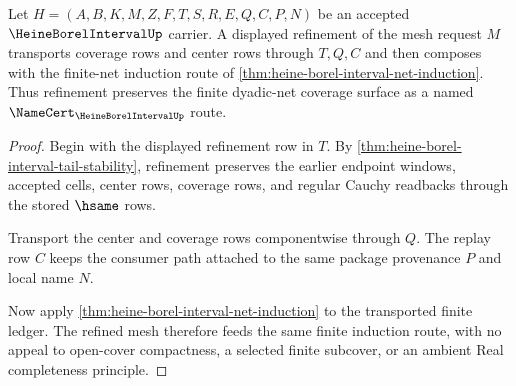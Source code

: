 \begin{theorem}
\label{thm:heine-borel-interval-mesh-refinement-functoriality}
Let $H=(A,B,K,M,Z,F,T,S,R,E,Q,C,P,N)$ be an accepted $\HeineBorelIntervalUp$ carrier. A displayed refinement of the mesh request $M$ transports coverage rows and center rows through $T,Q,C$ and then composes with the finite-net induction route of \autoref{thm:heine-borel-interval-net-induction}. Thus refinement preserves the finite dyadic-net coverage surface as a named $\NameCert_{\HeineBorelIntervalUp}$ route.
\end{theorem}
\begin{proof}
Begin with the displayed refinement row in $T$. By \autoref{thm:heine-borel-interval-tail-stability}, refinement preserves the earlier endpoint windows, accepted cells, center rows, coverage rows, and regular Cauchy readbacks through the stored $\hsame$ rows.

Transport the center and coverage rows componentwise through $Q$. The replay row $C$ keeps the consumer path attached to the same package provenance $P$ and local name $N$.

Now apply \autoref{thm:heine-borel-interval-net-induction} to the transported finite ledger. The refined mesh therefore feeds the same finite induction route, with no appeal to open-cover compactness, a selected finite subcover, or an ambient Real completeness principle.
\end{proof}

